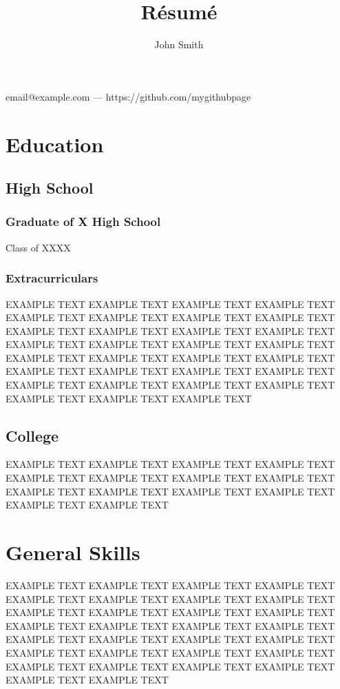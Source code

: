 \documentclass{article}
\begin{document}
\title{R\'esum\'e}
\author{John Smith}

\maketitle

\vspace{.25em}

\begin{center}
email@example.com --- https://github.com/mygithubpage
\end{center}
\section{Education}

\subsection{High School}
\subsubsection{Graduate of X High School}
 Class of XXXX
\subsubsection{Extracurriculars}
EXAMPLE TEXT EXAMPLE TEXT EXAMPLE TEXT EXAMPLE TEXT EXAMPLE TEXT EXAMPLE TEXT EXAMPLE TEXT EXAMPLE TEXT EXAMPLE TEXT EXAMPLE TEXT EXAMPLE TEXT EXAMPLE TEXT EXAMPLE TEXT EXAMPLE TEXT EXAMPLE TEXT EXAMPLE TEXT EXAMPLE TEXT EXAMPLE TEXT EXAMPLE TEXT EXAMPLE TEXT EXAMPLE TEXT EXAMPLE TEXT EXAMPLE TEXT EXAMPLE TEXT EXAMPLE TEXT EXAMPLE TEXT EXAMPLE TEXT EXAMPLE TEXT EXAMPLE TEXT EXAMPLE TEXT EXAMPLE TEXT

\subsection{College}
EXAMPLE TEXT EXAMPLE TEXT EXAMPLE TEXT EXAMPLE TEXT EXAMPLE TEXT EXAMPLE TEXT EXAMPLE TEXT EXAMPLE TEXT EXAMPLE TEXT EXAMPLE TEXT EXAMPLE TEXT EXAMPLE TEXT EXAMPLE TEXT EXAMPLE TEXT

\section{General Skills}
EXAMPLE TEXT EXAMPLE TEXT EXAMPLE TEXT EXAMPLE TEXT EXAMPLE TEXT EXAMPLE TEXT EXAMPLE TEXT EXAMPLE TEXT EXAMPLE TEXT EXAMPLE TEXT EXAMPLE TEXT EXAMPLE TEXT EXAMPLE TEXT EXAMPLE TEXT EXAMPLE TEXT EXAMPLE TEXT EXAMPLE TEXT EXAMPLE TEXT EXAMPLE TEXT EXAMPLE TEXT EXAMPLE TEXT EXAMPLE TEXT EXAMPLE TEXT EXAMPLE TEXT EXAMPLE TEXT EXAMPLE TEXT EXAMPLE TEXT EXAMPLE TEXT EXAMPLE TEXT EXAMPLE TEXT
\end{document}
